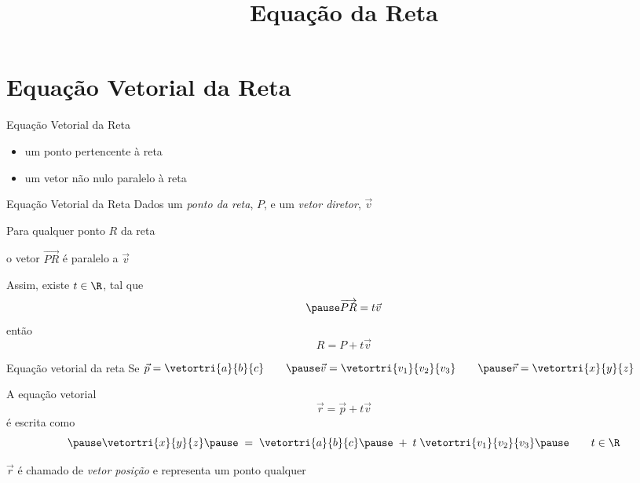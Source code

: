 \documentclass[fleqn,aspectratio=169,12pt]{beamer}
\title{Equação da Reta}
\begin{document}
\addtitle

\section{Equação Vetorial da Reta}


\begin{frame}{Equação Vetorial da Reta}
  \begin{itemize}[<+->]
      \item um ponto pertencente à reta
      \item um vetor não nulo paralelo à reta
  \end{itemize}
\end{frame}

\begin{frame}{Equação Vetorial da Reta}
  Dados um \emph{ponto da reta}, $P$,
  \pause
  e um \emph{vetor diretor}, $\vec{v}$

  \pause
  Para qualquer ponto $R$ da reta

  \pause
  o vetor $\overrightarrow{PR}$ é paralelo a $\vec{v}$

  \pause
  Assim, existe $t\in\R$, tal que
  \[
    \pause
    \overrightarrow{PR} = t\vec{v}
  \]
  \pause
  então
  \[
    R = P + t\vec{v}
  \]
\end{frame}

\begin{frame}{Equação vetorial da reta}
  Se\quad
  \(
    \vec{p} = \vetortri{a}{b}{c}         \qquad \pause
    \vec{v} = \vetortri{v_1}{v_2}{v_3}   \qquad \pause
    \vec{r} = \vetortri{x}{y}{z}
  \)

  \pause
  A equação vetorial
  \[
    \vec{r} = \vec{p} + t\vec{v}
  \]
  \pause
  é escrita como
  \[
    \pause
    \vetortri{x}{y}{z}
    \pause
    \;=\; \vetortri{a}{b}{c}
    \pause
    \;+\; t\; \vetortri{v_1}{v_2}{v_3}
    \pause
    \qquad t \in \R
  \]

  \pause
  $\vec{r}$ é chamado de \emph{vetor posição} e representa um ponto qualquer
\end{frame}
\end{document}
